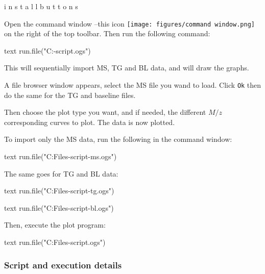 \documentclass[a4paper, 11pt, raggedright, parskip]{tufte-style-article}
\begin{document}

i n s t a l l   b u t t o n s

Open the command window --this icon \texttt{[image: figures/command window.png]} on the right of the top toolbar. Then run the following command:

\begin{codebox}{text}
run.file("C:\ProgramFiles{}\tgmsplot-script\main.ogs")
\end{codebox}

This will sequentially import MS, TG and BL data, and will draw the graphs.

A file browser window appears, select the MS file you wand to load. Click \texttt{Ok} then do the same for the TG and baseline files.

Then choose the plot type you want, and if needed, the different $M/z$ corresponding curves to plot. The data is now plotted.

To import only the MS data, run the following in the command window:
\begin{codebox}{text}
run.file("C:\Program Files\tgmsplot-script-ms.ogs")
\end{codebox}
The same goes for TG and BL data:
\begin{codebox}{text}
run.file("C:\Program Files\tgmsplot-script-tg.ogs")
\end{codebox}
\begin{codebox}{text}
run.file("C:\Program Files\tgmsplot-script-bl.ogs")
\end{codebox}
Then, execute the plot program:
\begin{codebox}{text}
run.file("C:\Program Files\tgmsplot-script\plot.ogs")
\end{codebox}


\subsubsection{Script and execution details}
\end{document}

